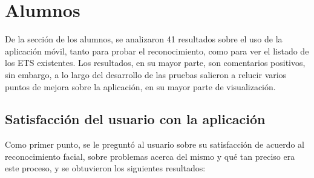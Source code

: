\section{Alumnos}
De la sección de los alumnos, se analizaron 41 resultados sobre el uso de la aplicación móvil, tanto para probar el reconocimiento, como para ver el listado de los ETS existentes. 
Los resultados, en su mayor parte, son comentarios positivos, sin embargo, a lo largo del desarrollo de las pruebas salieron a relucir varios puntos de mejora sobre la aplicación, en su mayor parte de visualización.

\subsection{Satisfacción del usuario con la aplicación}
Como primer punto, se le preguntó al usuario sobre su satisfacción de acuerdo al reconocimiento facial, sobre problemas acerca del mismo y qué tan preciso era este proceso, y se obtuvieron los siguientes resultados:
\newpage

